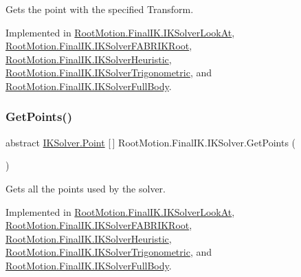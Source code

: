 Gets the point with the specified Transform. 



Implemented in \mbox{\hyperlink{class_root_motion_1_1_final_i_k_1_1_i_k_solver_look_at_ad2a93f6d541ff1a901ba93748094ff9b}{Root\+Motion.\+Final\+I\+K.\+I\+K\+Solver\+Look\+At}}, \mbox{\hyperlink{class_root_motion_1_1_final_i_k_1_1_i_k_solver_f_a_b_r_i_k_root_aee270791ec6890152459f80c211196f0}{Root\+Motion.\+Final\+I\+K.\+I\+K\+Solver\+F\+A\+B\+R\+I\+K\+Root}}, \mbox{\hyperlink{class_root_motion_1_1_final_i_k_1_1_i_k_solver_heuristic_a6f6fe66f3e434877da9d23e492448fda}{Root\+Motion.\+Final\+I\+K.\+I\+K\+Solver\+Heuristic}}, \mbox{\hyperlink{class_root_motion_1_1_final_i_k_1_1_i_k_solver_trigonometric_a4467e4a83b21ffeb535801b09798bf06}{Root\+Motion.\+Final\+I\+K.\+I\+K\+Solver\+Trigonometric}}, and \mbox{\hyperlink{class_root_motion_1_1_final_i_k_1_1_i_k_solver_full_body_a7d50e5600dfb189d37780f8e74b9b5f9}{Root\+Motion.\+Final\+I\+K.\+I\+K\+Solver\+Full\+Body}}.

\mbox{\label{class_root_motion_1_1_final_i_k_1_1_i_k_solver_a29b0746bebf6bd6645cdeb6617030bff}} 
\subsubsection{\texorpdfstring{Get\+Points()}{GetPoints()}}
{\footnotesize\ttfamily abstract \mbox{\hyperlink{class_root_motion_1_1_final_i_k_1_1_i_k_solver_1_1_point}{I\+K\+Solver.\+Point}} \mbox{[}$\,$\mbox{]} Root\+Motion.\+Final\+I\+K.\+I\+K\+Solver.\+Get\+Points (\begin{DoxyParamCaption}{ }\end{DoxyParamCaption})\hspace{0.3cm}{\ttfamily [pure virtual]}}



Gets all the points used by the solver. 



Implemented in \mbox{\hyperlink{class_root_motion_1_1_final_i_k_1_1_i_k_solver_look_at_ac2f6da94b707c8482aced5abc64a341f}{Root\+Motion.\+Final\+I\+K.\+I\+K\+Solver\+Look\+At}}, \mbox{\hyperlink{class_root_motion_1_1_final_i_k_1_1_i_k_solver_f_a_b_r_i_k_root_a386a3cb55b688ec13b8bb2299c0f2e75}{Root\+Motion.\+Final\+I\+K.\+I\+K\+Solver\+F\+A\+B\+R\+I\+K\+Root}}, \mbox{\hyperlink{class_root_motion_1_1_final_i_k_1_1_i_k_solver_heuristic_a1b250288b7b2b165e6e7f30048410f05}{Root\+Motion.\+Final\+I\+K.\+I\+K\+Solver\+Heuristic}}, \mbox{\hyperlink{class_root_motion_1_1_final_i_k_1_1_i_k_solver_trigonometric_a4cdd035f3007bc29385299e6d3c3cea9}{Root\+Motion.\+Final\+I\+K.\+I\+K\+Solver\+Trigonometric}}, and \mbox{\hyperlink{class_root_motion_1_1_final_i_k_1_1_i_k_solver_full_body_a3f5d0189403f02d2b30c6174c2a00fbb}{Root\+Motion.\+Final\+I\+K.\+I\+K\+Solver\+Full\+Body}}.

